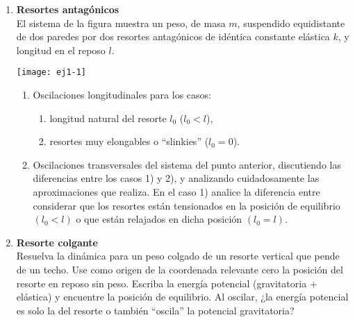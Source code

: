 \documentclass[11pt,spanish,a4paper]{article}
\begin{document}
\begin{enumerate}
\item
\begin{minipage}[t][1.9cm]{0.7\textwidth}
\textbf{Resortes antagónicos}\\
El sistema de la figura muestra un peso, de masa $m$, suspendido equidistante de dos paredes por dos resortes antagónicos de idéntica constante elástica $k$, y longitud en el reposo $l$.
\end{minipage}
\begin{minipage}[c][0cm][t]{0.25\textwidth}
  \texttt{[image: ej1-1]}
\end{minipage}
\begin{enumerate}
	\item Oscilaciones longitudinales para los casos:   
	\begin{enumerate}
		\item longitud natural del resorte $l_0$ ($l_0 < l$),   
		\item resortes muy elongables o ``slinkies'' ($l_0 = 0$).   
	\end{enumerate}
	\item Oscilaciones transversales del sistema del punto anterior, discutiendo las diferencias entre los casos 1) y 2), y analizando cuidadosamente las aproximaciones que realiza.
	En el caso 1) analice la diferencia entre considerar que los resortes están tensionados en la posición de equilibrio $(l_{0}<l)$ o que están relajados en dicha posición $(l_0= l)$.
\end{enumerate}



\item 
\textbf{Resorte colgante}\\
Resuelva la dinámica para un peso colgado de un resorte vertical que pende de un techo.
Use como origen de la coordenada relevante cero la posición del resorte en reposo sin peso.
Escriba la energía potencial (gravitatoria + elástica) y encuentre la posición de equilibrio.
Al oscilar, ¿la energía potencial es solo la del resorte o también ``oscila'' la potencial gravitatoria?



\end{enumerate}
\end{document}
